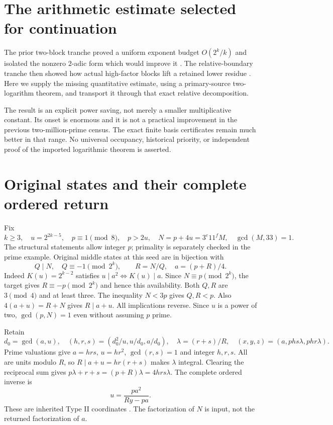 \section{The arithmetic estimate selected for continuation}
The prior two-block tranche proved a uniform exponent budget $O(2^k/k)$ and
isolated the nonzero $2$-adic form which would improve it
\cite[Theorem 3, (15)--(20)]{PriorTwo}. The relative-boundary tranche then
showed how actual high-factor blocks lift a retained lower residue
\cite[Theorem 2, (C3)--(C7)]{PriorRelative}. Here we supply the missing
quantitative estimate, using a primary-source two-logarithm theorem, and
transport it through that exact relative decomposition.

The result is an explicit power saving, not merely a smaller multiplicative
constant. Its onset is enormous and it is not a practical improvement in the
previous two-million-prime census. The exact finite basis certificates remain
much better in that range. No universal occupancy, historical priority, or
independent proof of the imported logarithmic theorem is asserted.

\section{Original states and their complete ordered return}
Fix
\[
 k\ge3,\quad u=2^{2k-5},\quad p\equiv1\pmod8,\quad p>2u,
 \quad N=p+4u=3^e11^fM,\quad\gcd(M,33)=1.                 \tag{A1}
\]
The structural statements allow integer $p$; primality is separately checked
in the prime example. Original middle states at this seed are in bijection with
\[
 Q\mid N,\quad Q\equiv-1\pmod{2^k},\qquad
 R=N/Q,\quad a=(p+R)/4.                                  \tag{A2}
\]
Indeed $K(u)=2^{k-2}$ satisfies $u\mid a^2\iff K(u)\mid a$.
Since $N\equiv p\pmod{2^k}$, the target gives $R\equiv-p\pmod{2^k}$
and hence this availability. Both $Q,R$ are $3\pmod4$ and at least three.
The inequality $N<3p$ gives $Q,R<p$. Also $4(a+u)=R+N$ gives
$R\mid a+u$. All implications reverse. Since $u$ is a power of two,
$\gcd(p,N)=1$ even without assuming $p$ prime.

Retain
\[
 d_0=\gcd(a,u),\quad(h,r,s)=(d_0^2/u,u/d_0,a/d_0),\quad
 \lambda=(r+s)/R,\quad(x,y,z)=(a,phs\lambda,phr\lambda).    \tag{A3}
\]
Prime valuations give $a=hrs$, $u=hr^2$, $\gcd(r,s)=1$ and integer
$h,r,s$. All are units modulo $R$, so $R\mid a+u=hr(r+s)$ makes
$\lambda$ integral. Clearing the reciprocal sum gives
$p\lambda+r+s=(p+R)\lambda=4hrs\lambda$. The complete ordered inverse is
\[
 \boxed{u=\frac{pa^2}{Ry-pa}.}                             \tag{A4}
\]
These are inherited Type II coordinates \cite[\S2, (2.13)--(2.22)]{ET}.
The factorization of $N$ is input, not the returned factorization of $a$.

